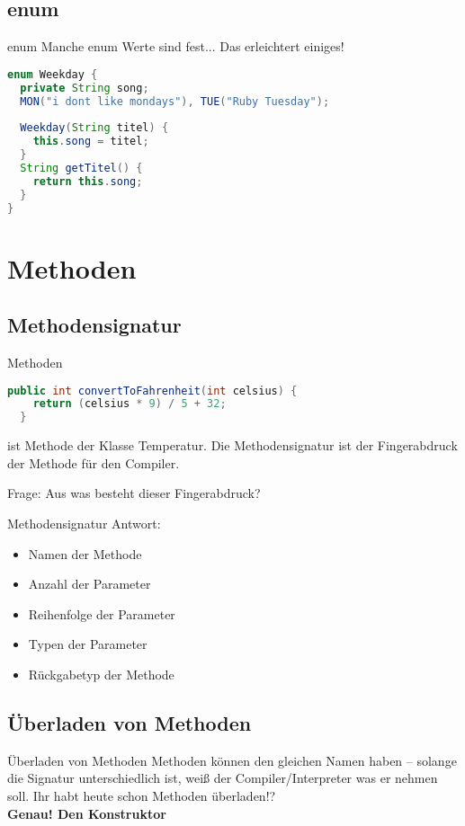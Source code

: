 \documentclass[18pt]{beamer}
\begin{document}
\subsection{enum}
\begin{frame}[fragile]{enum}
Manche enum Werte sind fest... \pause
Das erleichtert einiges!
 \begin{lstlisting}[language=java]
enum Weekday {
  private String song;
  MON("i dont like mondays"), TUE("Ruby Tuesday");
  
  Weekday(String titel) {
    this.song = titel;
  }
  String getTitel() {
    return this.song;
  }
}
 \end{lstlisting}
\end{frame}

\section{Methoden}
\subsection{Methodensignatur}
\begin{frame}[fragile]{Methoden}
 \begin{lstlisting}[language=java]
  public int convertToFahrenheit(int celsius) {
    return (celsius * 9) / 5 + 32;
  }
 \end{lstlisting}
 ist Methode der Klasse Temperatur. Die Methodensignatur ist der Fingerabdruck der Methode für den Compiler.
 
 Frage: Aus was besteht dieser Fingerabdruck?
\end{frame}

\begin{frame}{Methodensignatur}
Antwort:
 \begin{itemize}
  \item Namen der Methode
  \item Anzahl der Parameter
  \item Reihenfolge der Parameter
  \item Typen der Parameter
  \item Rückgabetyp der Methode
 \end{itemize}

\end{frame}

\subsection{Überladen von Methoden}
\begin{frame}{Überladen von Methoden}
 Methoden können den gleichen Namen haben – solange die Signatur unterschiedlich ist, weiß der Compiler/Interpreter was er nehmen soll.
 Ihr habt heute schon Methoden überladen!? \\ \pause
 \textbf{Genau! Den Konstruktor}
\end{frame}
\end{document}
